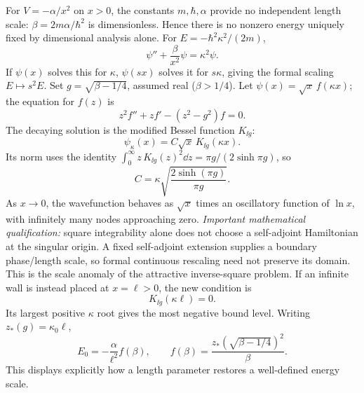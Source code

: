 For $V=-\alpha/x^2$ on $x>0$, the constants
$m,\hbar,\alpha$ provide no independent length
scale: $\beta=2m\alpha/\hbar^2$ is dimensionless.
Hence there is no nonzero energy uniquely fixed
by dimensional analysis alone.
For $E=-\hbar^2\kappa^2/(2m)$,
\begin{equation}
\psi''+\frac{\beta}{x^2}\psi=\kappa^2\psi.
\end{equation}
If $\psi(x)$ solves this for $\kappa$,
$\psi(sx)$ solves it for $s\kappa$, giving
the formal scaling $E\mapsto s^2E$.
Set $g=\sqrt{\beta-1/4}$, assumed real
($\beta>1/4$). Let $\psi(x)=\sqrt x\,f(\kappa x)$;
the equation for $f(z)$ is
\begin{equation}
z^2f''+zf'-(z^2-g^2)f=0.
\end{equation}
The decaying solution is the modified Bessel
function $K_{\ii g}$:
\begin{equation}
\boxed{\psi_\kappa(x)=C\sqrt x\,K_{\ii g}(\kappa x)}.
\end{equation}
Its norm uses the identity
$\int_0^\infty z\,K_{\ii g}(z)^2\dd z
=\pi g/(2\sinh\pi g)$, so
\begin{equation}
\boxed{C=\kappa\sqrt{\frac{2\sinh(\pi g)}{\pi g}}}.
\end{equation}
As $x\to0$, the wavefunction behaves as
$\sqrt x$ times an oscillatory function of $\ln x$,
with infinitely many nodes approaching zero.
\textit{Important mathematical qualification:}
square integrability alone does not choose
a self-adjoint Hamiltonian at the singular origin.
A fixed self-adjoint extension supplies a
boundary phase/length scale, so formal
continuous rescaling need not preserve its
domain. This is the scale anomaly of the
attractive inverse-square problem.
If an infinite wall is instead placed at
$x=\ell>0$, the new condition is
\begin{equation}
\boxed{K_{\ii g}(\kappa\ell)=0}.
\end{equation}
Its largest positive $\kappa$ root
gives the most negative bound level.
Writing $z_*(g)=\kappa_0\ell$,
\begin{equation}
\boxed{E_0=-\frac{\alpha}{\ell^2}
f(\beta)},\qquad
\boxed{f(\beta)=\frac{z_*(\sqrt{\beta-1/4})^2}{\beta}}.
\end{equation}
This displays explicitly how a length parameter
restores a well-defined energy scale.

